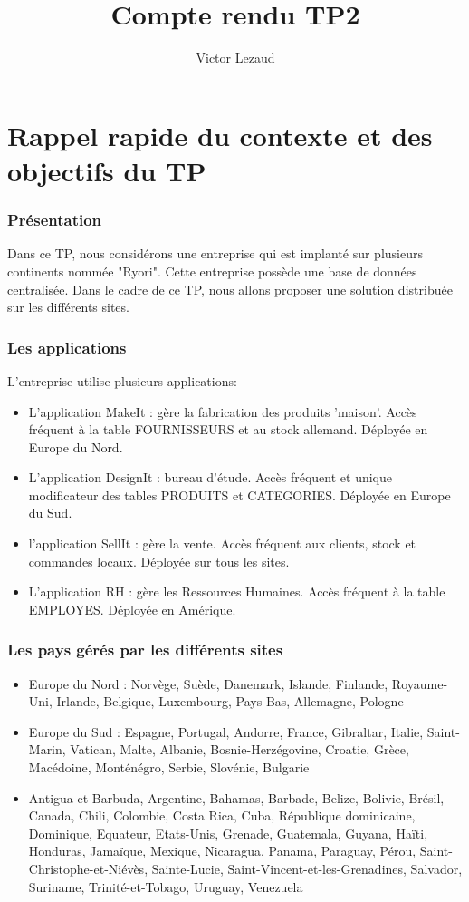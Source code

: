 \documentclass[10pt,a4paper,twoside]{article}
\author{Victor Lezaud}
\title{Compte rendu TP2}
\begin{document}
\maketitle
\renewcommand{\contentsname}{Sommaire}
\tableofcontents

\newpage
\part{Rappel rapide du contexte et des objectifs du TP}
\section{Présentation}
Dans ce TP, nous considérons une entreprise qui est implanté sur plusieurs continents nommée "Ryori". Cette entreprise possède une base de données centralisée. Dans le cadre de ce TP, nous allons proposer une solution distribuée sur les différents sites.

\section{Les applications}
L'entreprise utilise plusieurs applications:
\begin{itemize}
\item L'application MakeIt : gère la fabrication des produits 'maison'. Accès fréquent à la table FOURNISSEURS et au stock allemand. Déployée en Europe du Nord.
\item L'application DesignIt : bureau d'étude. Accès fréquent et unique modificateur des tables PRODUITS et CATEGORIES. Déployée en Europe du Sud.
\item l'application SellIt : gère la vente. Accès fréquent aux clients, stock et commandes locaux. Déployée sur tous les sites.
\item L'application RH : gère les Ressources Humaines. Accès fréquent à la table EMPLOYES. Déployée en Amérique.
\end{itemize}

\section{Les pays gérés par les différents sites}
\begin{itemize}
\item Europe du Nord : Norvège, Suède, Danemark, Islande, Finlande, Royaume-Uni, Irlande, Belgique, Luxembourg, Pays-Bas, Allemagne, Pologne
\item Europe du Sud : Espagne, Portugal, Andorre, France, Gibraltar, Italie, Saint-Marin, Vatican, Malte, Albanie, Bosnie-Herzégovine, Croatie, Grèce, Macédoine, Monténégro, Serbie, Slovénie, Bulgarie
\item Antigua-et-Barbuda, Argentine, Bahamas, Barbade, Belize, Bolivie, Brésil, Canada, Chili, Colombie, Costa Rica, Cuba, République dominicaine, Dominique, Equateur, Etats-Unis, Grenade, Guatemala, Guyana, Haïti, Honduras, Jamaïque, Mexique, Nicaragua, Panama, Paraguay, Pérou, Saint-Christophe-et-Niévès, Sainte-Lucie, Saint-Vincent-et-les-Grenadines, Salvador, Suriname, Trinité-et-Tobago, Uruguay, Venezuela
\end{itemize}
\end{document}
